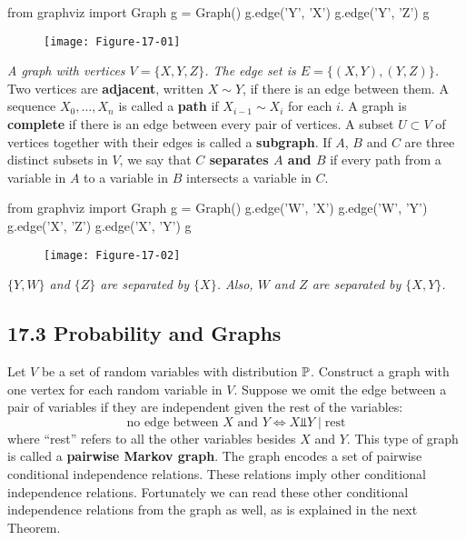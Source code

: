 \begin{python}
from graphviz import Graph
g = Graph()
g.edge('Y', 'X')
g.edge('Y', 'Z')
g
\end{python}

\begin{figure}[H]
\centering
\texttt{[image: Figure-17-01]}
\end{figure}

\emph{A graph with vertices \(V = \{X, Y, Z\}\). The edge set is
\(E = \{(X, Y), (Y, Z)\}\).}
Two vertices are \textbf{adjacent}, written \(X \sim Y\), if there is an
edge between them. A sequence \(X_{0}, \dots, X_{n}\) is called a
\textbf{path} if \(X_{i-1} \sim X_{i}\) for each \(i\). A graph is
\textbf{complete} if there is an edge between every pair of vertices. A
subset \(U \subset V\) of vertices together with their edges is called a
\textbf{subgraph}.
If \(A\), \(B\) and \(C\) are three distinct subsets in \(V\), we say
that \textbf{\(C\) separates \(A\) and \(B\)} if every path from a
variable in \(A\) to a variable in \(B\) intersects a variable in \(C\).

\begin{python}
from graphviz import Graph
g = Graph()
g.edge('W', 'X')
g.edge('W', 'Y')
g.edge('X', 'Z')
g.edge('X', 'Y')
g
\end{python}

\begin{figure}[H]
\centering
\texttt{[image: Figure-17-02]}
\end{figure}

\emph{\(\{Y, W\}\) and \(\{Z\}\) are separated by \(\{X\}\). Also, \(W\)
and \(Z\) are separated by \(\{X, Y\}\).}

\subsection*{17.3 Probability and Graphs}\label{probability:graphs}
Let \(V\) be a set of random variables with distribution \(\operatorname{\mathbb{P}}\).
Construct a graph with one vertex for each random variable in \(V\).
Suppose we omit the edge between a pair of variables if they are
independent given the rest of the variables:
\[
\text{no edge between } X \text{ and } Y \Leftrightarrow X \text{⫫} Y \;|\; \text{rest}
\]
where ``rest'' refers to all the other variables besides \(X\) and
\(Y\). This type of graph is called a \textbf{pairwise Markov graph}.
The graph encodes a set of pairwise conditional independence relations.
These relations imply other conditional independence relations.
Fortunately we can read these other conditional independence relations
from the graph as well, as is explained in the next Theorem.

